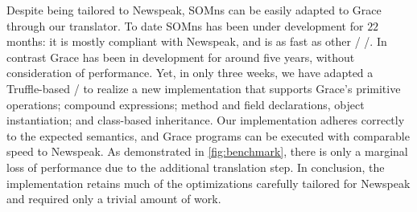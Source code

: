 Despite being tailored to Newspeak, SOMns can be easily adapted to Grace through our translator. To date SOMns has been under development for $22$ months: it is mostly compliant with Newspeak, and is as fast as other \JITing/ \vms/. In contrast Grace has been in development for around five years, without consideration of performance. Yet, in only three weeks, we have adapted a Truffle-based \vm/ to realize a new implementation that supports Grace's primitive operations; compound expressions; method and field declarations, object instantiation; and class-based inheritance. Our implementation adheres correctly to the expected semantics, and Grace programs can be executed with comparable speed to Newspeak. As demonstrated in \autoref{fig:benchmark}, there is only a marginal loss of performance due to the additional translation step. In conclusion, the implementation retains much of the optimizations carefully tailored for Newspeak and required only a trivial amount of work.



